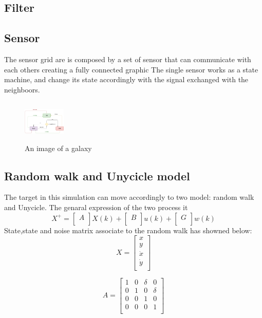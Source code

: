 \documentclass{article}
\begin{document}
\begin{multicols}{2}
    \subsection*{Filter}
    \subsection*{Sensor}
    The sensor grid are is composed by a set of sensor that can communicate with each others creating a fully connected graphic
    The single sensor works as a state machine, and change its state accordingly with the signal exchanged with the neighboors.
    \begin{figure}[htp]
        \centering
        \includegraphics[width=2cm, height=2cm]{UntitledDiagram.png}
        \caption{An image of a galaxy}
        \label{fig:galaxy}
    \end{figure}
    \subsection*{Random walk and Unycicle model}
    The target in this simulation can move accordingly to two model: random walk and Unycicle. The genaral expression of the two process it
    \begin{equation}
    X^{+}=\begin{bmatrix} A \\ \end{bmatrix}X(k)+\begin{bmatrix} B \\ \end{bmatrix}u(k) + \begin{bmatrix} G \\ \end{bmatrix}w(k)
    \end{equation}
    State,state and noise matrix associate to the random walk has showned below:
    $$
    X=\begin{bmatrix} x \\ y \\ \dot{x} \\ \dot{y} \\ \end{bmatrix}
    $$

    $$
    A=\begin{bmatrix}
    1&0&\delta&0\\
    0&1&0&\delta\\
    0&0&1&0\\
    0&0&0&1\\
    \end{bmatrix}
    $$


\end{multicols}
\end{document}
